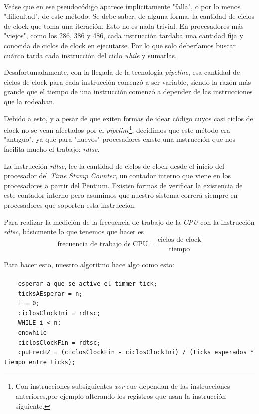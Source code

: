 \documentclass[a4paper,10pt]{article}
\begin{document}
    \paragraph*{}
    Veáse que en ese pseudocódigo aparece ímplicitamente "falla", o por lo menos "dificultad", de este método. Se debe saber, de alguna forma, la cantidad de ciclos
    de clock que toma una iteración. Esto no es nada trivial. En procesadores más "viejos", como los 286, 386 y 486, cada instrucción tardaba una cantidad fija y conocida
    de ciclos de clock en ejecutarse. Por lo que solo deberíamos buscar cuánto tarda cada instrucción del ciclo \textit{while} y sumarlas.

    Desafortunadamente, con la llegada de la tecnología \textit{pipeline}, esa cantidad de ciclos de clock para cada instrucción comenzó a ser variable, siendo la 
    razón más grande que el tiempo de una instrucción comenzó a depender de las instrucciones que la rodeaban.

    Debido a esto, y a pesar de que exiten formas de idear código cuyos casi ciclos de clock no se vean afectados por el \textit{pipeline}\footnote{ Con 
    instrucciones subsiguientes \textit{xor} que dependan de las instrucciones anteriores,por ejemplo alterando los registros que usan la instrucción siguiente.}, 
    decidimos que este método era "antiguo", ya que para "nuevos" procesadores existe una instrucción que nos facilita mucho el trabajo: \textit{rdtsc}.

    La instrucción \textit{rdtsc}, lee la cantidad de ciclos de clock desde el inicio del procesador del \textit{Time Stamp Counter}, un contador interno que viene
    en los procesadores a partir del Pentium. Existen formas de verificar la existencia de este contador interno pero asumimos que nuestro sistema correrá siempre en
    procesadores que soporten esta instrucción.

    Para realizar la medición de la frecuencia de trabajo de la \textit{CPU} con la instrucción \textit{rdtsc}, básicmente lo que tenemos que hacer es 
    \[  \text{frecuencia de trabajo de CPU} = \dfrac{\text{ciclos de clock}}{\text{tiempo}} \]
    
    Para hacer esto, nuestro algoritmo hace algo como esto:
    \paragraph*{}
    \begin{lstlisting}
    esperar a que se active el timmer tick;
    ticksAEsperar = n;
    i = 0;
    ciclosClockIni = rdtsc;
    WHILE i < n:
    endwhile
    ciclosClockFin = rdtsc;
    cpuFrecHZ = (ciclosClockFin - ciclosClockIni) / (ticks esperados * tiempo entre ticks);
    \end{lstlisting}
\end{document}
